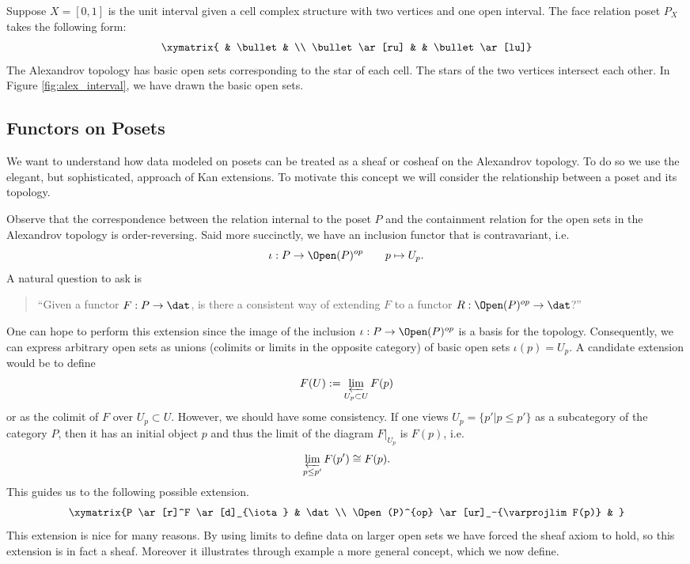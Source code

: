 \begin{ex}
	Suppose $X=[0,1]$ is the unit interval given a cell complex structure with two vertices and one open interval. The face relation poset $P_X$ takes the following form:
	\[
		\xymatrix{ & \bullet & \\ \bullet \ar[ru] & & \bullet \ar[lu]}
	\]
	The Alexandrov topology has basic open sets corresponding to the star of each cell. The stars of the two vertices intersect each other. In Figure \ref{fig:alex_interval}, we have drawn the basic open sets.
\end{ex}

\subsection{Functors on Posets}
\label{subsubsec:fun_kan}
We want to understand how data modeled on posets can be treated as a sheaf or cosheaf on the Alexandrov topology. To do so we use the elegant, but sophisticated, approach of Kan extensions. To motivate this concept we will consider the relationship between a poset and its topology.

Observe that the correspondence between the relation internal to the poset $P$ and the containment relation for the open sets in the Alexandrov topology is order-reversing. Said more succinctly, we have an inclusion functor that is contravariant, i.e.
\[
\iota: P\to \Open(P)^{op} \qquad p \mapsto U_p.
\]
A natural question to ask is 
\begin{quote}
	``Given a functor $F:P\to\dat$, is there a consistent way of extending $F$ to a functor $R:\Open(P)^{op}\to\dat$?''
\end{quote} 
One can hope to perform this extension since the image of the inclusion $\iota:P\to\Open(P)^{op}$ is a basis for the topology. Consequently, we can express arbitrary open sets as unions (colimits or limits in the opposite category) of basic open sets $\iota(p)=U_p$. A candidate extension would be to define 
\[
F(U):=\varprojlim_{U_p\subset U} F(p)
\] 
or as the colimit of $F$ over $U_p\subset U$. However, we should have some consistency. If one views $U_p=\{p'|p\leq p'\}$ as a subcategory of the category $P$, then it has an initial object $p$ and thus the limit of the diagram $F|_{U_p}$ is $F(p)$, i.e. 
\[
	\varprojlim_{p\leq p'} F(p') \cong F(p).
\]
This guides us to the following possible extension.
\[
	\xymatrix{P \ar[r]^F \ar[d]_{\iota} & \dat \\
	\Open(P)^{op} \ar[ur]_-{\varprojlim F(p)} & }
\]
This extension is nice for many reasons. By using limits to define data on larger open sets we have forced the sheaf axiom to hold, so this extension is in fact a sheaf. Moreover it illustrates through example a more general concept, which we now define.

